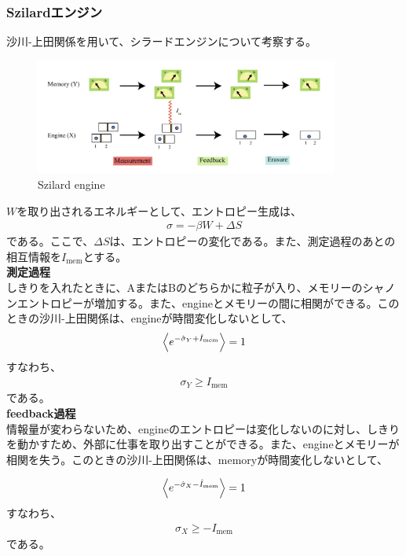 \documentclass[a4paper,11pt]{jsarticle}
\numberwithin{equation}{section}
\begin{document}
\subsubsection{Szilardエンジン}
沙川-上田関係を用いて、シラードエンジンについて考察する。\\
\begin{figure}[H]
    \begin{center}
    \includegraphics[width=100mm]{s.png}
    \end{center}
    \caption{Szilard engine}
    \label{fig:s}
\end{figure}

$W$を取り出されるエネルギーとして、エントロピー生成は、
\begin{align}
    \sigma = -\beta W + \Delta S
\end{align}
である。ここで、$\Delta S$は、エントロピーの変化である。また、測定過程のあとの相互情報を$I_{\text{mem}}$とする。\\

\textbf{測定過程}\\
しきりを入れたときに、AまたはBのどちらかに粒子が入り、メモリーのシャノンエントロピーが増加する。また、engineとメモリーの間に相関ができる。このときの沙川-上田関係は、engineが時間変化しないとして、
\begin{align}
    \ev{e^{-\hat{\sigma}_Y+\hat{I}_{\text{mem}}}} = 1
\end{align}
すなわち、
\begin{align}
    \sigma_Y \geq I_{\text{mem}}
\end{align}
である。\\

\textbf{feedback過程}\\
情報量が変わらないため、engineのエントロピーは変化しないのに対し、しきりを動かすため、外部に仕事を取り出すことができる。また、engineとメモリーが相関を失う。このときの沙川-上田関係は、memoryが時間変化しないとして、

\begin{align}
    \ev{e^{-\hat{\sigma}_X-\hat{I}_{\text{mem}}}} = 1
\end{align}
すなわち、
\begin{align}
    \sigma_X \geq -I_{\text{mem}}
\end{align}
である。\\
\end{document}
